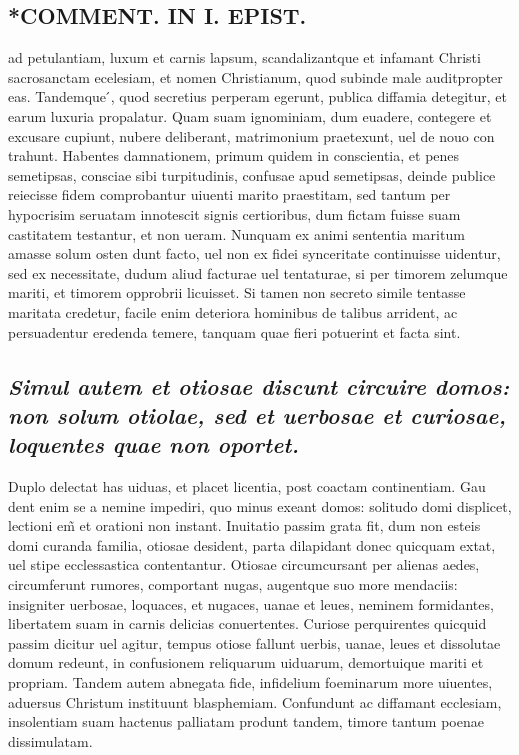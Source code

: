 \documentclass{article}
\begin{document}
\begin{pages}
\section*{*COMMENT. IN I. EPIST. }
\marginpar{[ p.520 ]}\pstart ad petulantiam, luxum et carnis lapsum, scandalizantque et infamant Christi sacrosanctam ecelesiam, et nomen Christianum, quod subinde male auditpropter eas. Tandemque ́, quod secretius perperam egerunt, publica diffamia detegitur, et earum luxuria propalatur. Quam suam ignominiam, dum euadere, contegere et excusare cupiunt, nubere deliberant, matrimonium praetexunt, uel de nouo con trahunt. Habentes damnationem, primum quidem in conscientia, et penes semetipsas, consciae sibi turpitudinis, confusae apud semetipsas, deinde publice reiecisse fidem comprobantur uiuenti marito praestitam, sed tantum per hypocrisim seruatam innotescit signis certioribus, dum fictam fuisse suam castitatem testantur, et non ueram. Nunquam ex animi sententia maritum amasse solum osten dunt facto, uel non ex fidei synceritate continuisse uidentur, sed ex necessitate, dudum aliud facturae uel tentaturae, si per timorem zelumque mariti, et timorem opprobrii licuisset. Si tamen non secreto simile tentasse maritata credetur, facile enim deteriora hominibus de talibus arrident, ac persuadentur eredenda temere, tanquam quae fieri potuerint et facta sint.  \pend
{}
{}
\subsection*{\textit{Simul autem et otiosae discunt circuire domos: non solum otiolae, sed et uerbosae et curiosae, loquentes quae non oportet. }}\pstart Duplo delectat has uiduas, et placet licentia, post coactam continentiam. Gau dent enim se a nemine impediri, quo minus exeant domos: solitudo domi displicet, lectioni em̃ et orationi non instant. Inuitatio passim grata fit, dum non esteis domi curanda familia, otiosae desident, parta dilapidant donec quicquam extat, uel stipe ecclessastica contentantur. Otiosae circumcursant per alienas aedes, circumferunt rumores, comportant nugas, augentque suo more mendaciis: insigniter uerbosae, loquaces, et nugaces, uanae et leues, neminem formidantes, libertatem suam in carnis delicias conuertentes. Curiose perquirentes quicquid passim dicitur uel agitur, tempus otiose fallunt uerbis, uanae, leues et dissolutae domum redeunt, in confusionem reliquarum uiduarum, demortuique mariti et propriam. Tandem autem abnegata fide, infidelium foeminarum more uiuentes, aduersus Christum instituunt blasphemiam. Confundunt ac diffamant ecclesiam, insolentiam suam hactenus palliatam produnt tandem, timore tantum poenae dissimulatam.  \pend
{}
{}

\end{pages}
\end{document}
